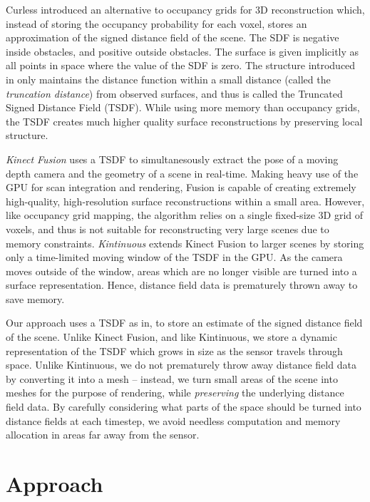 \documentclass[10pt,twocolumn,letterpaper]{article}
\begin{document}
Curless \cite{Curless1996} introduced an alternative to occupancy grids for 3D
reconstruction which, instead of storing the occupancy probability for each
voxel, stores an approximation of the signed distance field of the scene.  The
SDF is negative inside obstacles, and positive outside obstacles. The surface
is given implicitly as all points in space where the value of the SDF is zero.
The structure introduced in \cite{Curless1996} only maintains the distance
function within a small distance (called the \emph{truncation distance}) from
observed surfaces, and thus is called the Truncated Signed Distance Field
(TSDF).  While using more memory than occupancy grids, the TSDF creates much
higher quality surface reconstructions by preserving local structure.

\emph{Kinect Fusion} \cite{Newcombe} uses a TSDF to
simultanesously extract the pose of a moving depth camera and the geometry of a
scene in real-time. Making heavy use of the GPU for scan integration and
rendering, Fusion is capable of creating extremely high-quality, high-resolution surface 
reconstructions within a small area. However, like occupancy grid mapping, the
algorithm relies on a single fixed-size 3D grid of voxels, and thus is not
suitable for reconstructing very large scenes due to memory constraints. 
\emph{Kintinuous} \cite{Whelan2013} extends Kinect Fusion to larger
scenes by storing only a time-limited moving window of the TSDF in the GPU. As
the camera moves outside of the window, areas which are no longer visible are
turned into a surface representation. Hence, distance field data is prematurely
thrown away to save memory.

Our approach uses a TSDF as in\cite{Curless1996,Newcombe,Whelan2013,Bylow2013},
to store an estimate of the signed distance field of the scene. Unlike Kinect
Fusion, and like Kintinuous, we store a dynamic representation of the TSDF
which grows in size as the sensor travels through space. Unlike Kintinuous, we
do not prematurely throw away distance field data by converting it into a
mesh -- instead, we turn small areas of the scene into meshes for the purpose
of rendering, while \textit{preserving} the underlying distance field data. By
carefully considering what parts of the space should be turned into distance
fields at each timestep, we avoid needless computation and memory allocation in
areas far away from the sensor. 

\section{Approach} 
\end{document}

